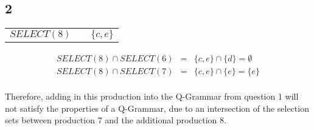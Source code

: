 \documentclass[a4paper,12pt]{article}
\begin{document}
\subsection*{2}

\begin{tabular}{lcl}
$SELECT(8)$	&	\hspace{10mm}	&	$\{c,e\}$	\\
\end{tabular}

\begin{eqnarray*}
SELECT(8) \cap SELECT(6)	&	=	&	\{c,e\} \cap \{d\} = \emptyset \\
SELECT(8) \cap SELECT(7)	&	=	&	\{c,e\} \cap \{e\} = \{e\} \\
\end{eqnarray*}

Therefore, adding in this production into the Q-Grammar from question $1$
will not satisfy the properties of a Q-Grammar, due to an intersection
of the selection sets between production $7$ and the additional
production $8$.
\end{document}
